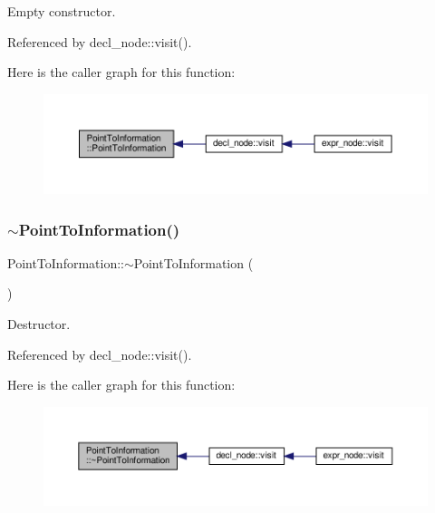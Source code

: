 Empty constructor. 



Referenced by decl\+\_\+node\+::visit().

Here is the caller graph for this function\+:
\nopagebreak
\begin{figure}[H]
\begin{center}
\leavevmode
\includegraphics[width=350pt]{d3/d82/structPointToInformation_a70dd4a9a913e62c85255283d6e523224_icgraph}
\end{center}
\end{figure}
\mbox{\label{structPointToInformation_a739fd1bd312a07834a8d47a91b1ef00e}} 
\subsubsection{\texorpdfstring{$\sim$\+Point\+To\+Information()}{~PointToInformation()}}
{\footnotesize\ttfamily Point\+To\+Information\+::$\sim$\+Point\+To\+Information (\begin{DoxyParamCaption}{ }\end{DoxyParamCaption})\hspace{0.3cm}{\ttfamily [default]}}



Destructor. 



Referenced by decl\+\_\+node\+::visit().

Here is the caller graph for this function\+:
\nopagebreak
\begin{figure}[H]
\begin{center}
\leavevmode
\includegraphics[width=350pt]{d3/d82/structPointToInformation_a739fd1bd312a07834a8d47a91b1ef00e_icgraph}
\end{center}
\end{figure}


